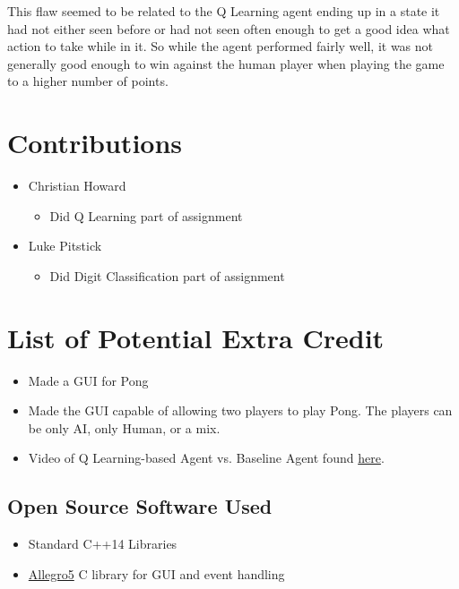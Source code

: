 \documentclass{article}[12pt]
\begin{document}
   This flaw seemed to be related to the Q Learning agent ending up in a state it had not either seen before or had not seen often enough to get a good idea what action to take while in it. So while the agent performed fairly well, it was not generally good enough to win against the human player when playing the game to a higher number of points.
  
   

\newpage
\section{Contributions}
\begin{itemize}
\item Christian Howard
	\begin{itemize}
	\item Did Q Learning part of assignment
	\end{itemize}
\item Luke Pitstick
\begin{itemize}
	\item Did Digit Classification part of assignment
\end{itemize}
\end{itemize}   
   
   
\newpage
   \section{List of Potential Extra Credit}
   \begin{itemize}
   \item Made a GUI for Pong
   \item Made the GUI capable of allowing two players to play Pong. The players can be only AI, only Human, or a mix.
   \item Video of Q Learning-based Agent vs. Baseline Agent found \href{https://www.youtube.com/watch?v=FWLAqNOhF6I}{here}.
\end{itemize}      
   
   \newpage
\begin{appendices}

   \section{Open Source Software Used}
   \begin{itemize}
   	\item Standard C++14 Libraries
   	\item \href{http://liballeg.org/}{Allegro5} C library for GUI and event handling
   \end{itemize}

\end{appendices}   
   
   
   
\end{document}
